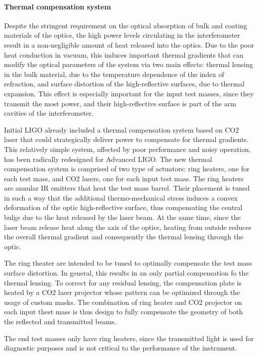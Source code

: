 \paragraph*{Thermal compensation system}\label{sec:presfut:ground:2gen:aLIGO:TCS}
Despite the stringent requirement on the optical absorption of bulk and coating materials of the optics, the high power levels circulating in the interferometer result in a non-negligible amount of heat released into the optics. Due to the poor heat conduction in vacuum, this induces important thermal gradients that can modify the optical parameters of the system via two main effects: thermal lensing in the bulk material, due to the temperature dependence of the index of refraction, and surface distortion of the high-reflective surfaces, due to thermal expansion. This effect is especially important for the input test masses, since they transmit the most power, and their high-reflective surface is part of the arm cavities of the interferometer.

Initial LIGO already included a thermal compensation system based on CO2 laser that could strategically deliver power to compensate for thermal gradients. This relatively simple system, affected by poor performance and noisy operation, has been radically redesigned for Advanced LIGO. The new thermal compensation system is comprised of two type of actuators: ring heaters, one for each test mass, and CO2 lasers, one for each input test mass. The ring heaters are annular IR emitters that heat the test mass barrel. Their placement is tuned in such a way that the additional thermo-mechanical stress induces a convex deformation of the optic high-reflective surface, thus compensating the central bulge due to the heat released by the laser beam. At the same time, since the laser beam release heat along the axis of the optics, heating from outside reduces the overall thermal gradient and consequently the thermal lensing through the optic.

The ring theater are intended to be tuned to optimally compensate the test mass surface distortion. In general, this results in an only partial compensation fo the thermal lensing. To correct for any residual lensing, the compensation plate is heated by a CO2 laser projector whose pattern can be optimized through the usage of custom masks. The combination of ring heater and CO2 projector on each input thest mass is thus design to fully compensate the geometry of both the reflected and transmitted beams.

The end test masses only have ring heaters, since the transmitted light is used for diagnostic purposes and is not critical to the performance of the instrument.

